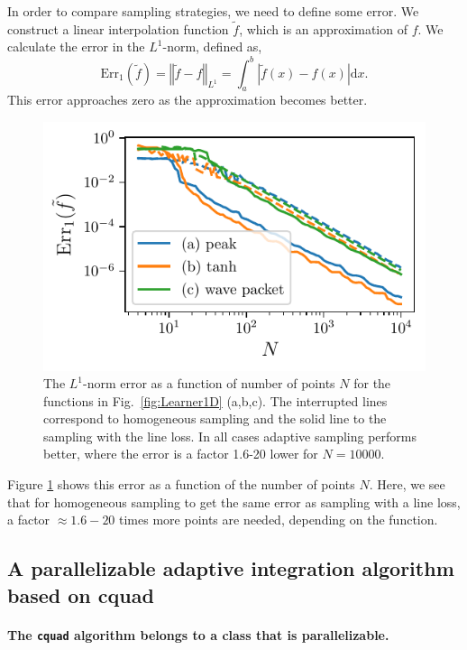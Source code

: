 \documentclass[english, twocolumn, 10pt, aps, superscriptaddress, floatfix, prb, citeautoscript]{revtex4-1}
\begin{document}
In order to compare sampling strategies, we need to define some error.
We construct a linear interpolation function \(\tilde{f}\), which is an approximation of \(f\).
We calculate the error in the \(L^{1}\)-norm, defined as,
\[
\text{Err}_{1}(\tilde{f})=\left\Vert \tilde{f}-f\right\Vert _{L^{1}}=\int_{a}^{b}\left|\tilde{f}(x)-f(x)\right|\text{d}x.
\]
This error approaches zero as the approximation becomes better.

\begin{figure}
\centering
\includegraphics{figures/line_loss_error.pdf}
\caption{The \(L^{1}\)-norm error as a function of number of points \(N\) for the functions in Fig.~\ref{fig:Learner1D} (a,b,c).
The interrupted lines correspond to homogeneous sampling and the solid line to the sampling with the line loss.
In all cases adaptive sampling performs better, where the error is a factor 1.6-20 lower for \(N=10000\).\label{fig:line_loss_error}}
\end{figure}

Figure \ref{fig:line_loss_error} shows this error as a function of the number of points \(N\).
Here, we see that for homogeneous sampling to get the same error as sampling with a line loss, a factor \(\approx 1.6-20\) times more points are needed, depending on the function.

\subsection{A parallelizable adaptive integration algorithm based on cquad}

\paragraph{\texorpdfstring{The \texttt{cquad} algorithm belongs to a class that is parallelizable.}{The cquad algorithm belongs to a class that is parallelizable.}}
\end{document}
